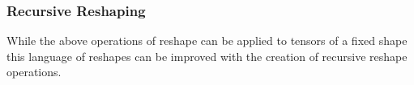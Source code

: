 \begin{code}%
\>[2][@{}l@{\AgdaIndent{1}}]%
\>[4]\AgdaSpace{}%
\AgdaSymbol{:}\<%
\\
\>[4][@{}l@{\AgdaIndent{0}}]%
\>[6]%
\>[937I]\AgdaSymbol{(}\AgdaSpace{}%
\AgdaSymbol{:}\AgdaSpace{}%
\AgdaSpace{}%
\AgdaSpace{}%
\AgdaSymbol{)}\<%
\\
\>[.][@{}l@{}]\<[937I]%
\>[8]\AgdaSymbol{(}\AgdaSpace{}%
\AgdaSymbol{:}\AgdaSpace{}%
\AgdaSpace{}%
\AgdaSpace{}%
\AgdaSymbol{)}\<%
\\
%
\>[6]\AgdaComment{---------------------}\<%
\\
%
\>[6]\AgdaSpace{}%
\AgdaSpace{}%
\AgdaSpace{}%
\AgdaSpace{}%
\AgdaSpace{}%
\AgdaSpace{}%
\AgdaSpace{}%
\AgdaSpace{}%
\AgdaSpace{}%
\<%
\\
%
\\[\AgdaEmptyExtraSkip]%
%
\>[4]\AgdaSpace{}%
\AgdaSymbol{:}\<%
\\
\>[4][@{}l@{\AgdaIndent{0}}]%
\>[6]%
\>[956I]\AgdaSymbol{(}\AgdaSpace{}%
\AgdaSymbol{:}\AgdaSpace{}%
\AgdaSpace{}%
\AgdaSpace{}%
\AgdaSymbol{)}\<%
\\
\>[.][@{}l@{}]\<[956I]%
\>[8]\AgdaSymbol{(}\AgdaSpace{}%
\AgdaSymbol{:}\AgdaSpace{}%
\AgdaSpace{}%
\AgdaSpace{}%
\AgdaSymbol{)}\<%
\\
%
\>[6]\AgdaComment{-----------------------------}\<%
\\
%
\>[6]\AgdaSpace{}%
\AgdaSpace{}%
\AgdaSpace{}%
\AgdaSpace{}%
\AgdaSymbol{(}\AgdaSpace{}%
\AgdaSymbol{)}\AgdaSpace{}%
\AgdaSpace{}%
\AgdaSpace{}%
\AgdaSpace{}%
\AgdaSpace{}%
\AgdaSpace{}%
\<%
\end{code}

\subsubsection{Recursive Reshaping}
While the above operations of reshape can be applied to tensors of a fixed shape
this language of reshapes can be improved with the creation of recursive reshape
operations.

